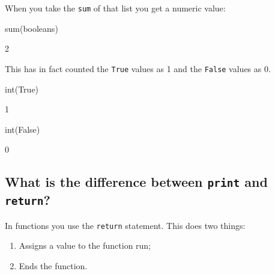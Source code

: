 When you take the \texttt{sum} of that list you get a numeric value:




\begin{pyin}
sum(booleans)
\end{pyin}





\begin{raw}
2
\end{raw}





This has in fact counted the \texttt{True} values as 1 and the \texttt{False} values as 0.




\begin{pyin}
int(True)
\end{pyin}





\begin{raw}
1
\end{raw}







\begin{pyin}
int(False)
\end{pyin}





\begin{raw}
0
\end{raw}





\subsection{What is the difference between \texttt{print} and \texttt{return}?}
\label{\detokenize{tools-for-mathematics/06-probability/why/main:what-is-the-difference-between-print-and-return}}

In functions you use the \texttt{return} statement. This does two things:
\begin{enumerate}

\item 

Assigns a value to the function run;

\item 

Ends the function.

\end{enumerate}


